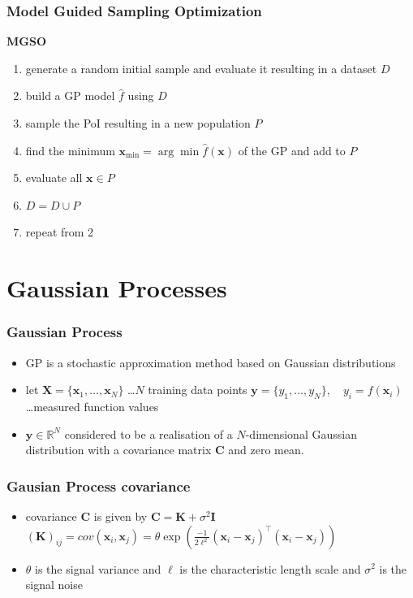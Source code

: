 \documentclass[sans,mathserif]{beamer}
\newcommand{\xx}{\mathrm{\mathbf{x}}}
\newcommand{\XX}{\mathrm{\mathbf{X}}}
\newcommand{\yy}{\mathrm{\mathbf{y}}}
\newcommand{\R}{\mathrm{\mathbb{R}}}
\newcommand{\CC}{\mathrm{\mathbf{C}}}
\newcommand{\KK}{\mathrm{\mathbf{K}}}
\newcommand{\II}{\mathrm{\mathbf{I}}}
\newcommand{\blue}[1]{{\color{blue} #1}}
\begin{document}
\begin{frame}
  \frametitle{Model Guided Sampling Optimization}

  \textbf{MGSO}
  \begin{enumerate}
    \item generate a random initial sample and evaluate it resulting in a dataset $D$
    \item build a GP model $\hat{f}$ using $D$
    \item sample the PoI resulting in a new population $P$
    \item find the minimum $\xx_{\min} = \arg\min \hat{f}(\xx)$ of the GP and add to $P$
    \item evaluate all $\xx \in P$
    \item $D = D \cup P$
    \item repeat from 2
  \end{enumerate}
\end{frame}

\section{Gaussian Processes}

\begin{frame}
  \frametitle{Gaussian Process}
  \begin{itemize}
    \item GP is a stochastic approximation method based on Gaussian distributions
    \item let \newline
        $\XX = \{\xx_1, \dots, \xx_N\}$ \dots $N$ training data points
        $\yy = \{y_1, \dots, y_N \}, \quad y_i = f(\xx_i)\ $ \dots measured function values
    \item $\yy \in \R^N$ considered to be a realisation of a \blue{$N$-dimensional} Gaussian distribution
        with a covariance matrix $\CC$ and zero mean.
  \end{itemize}
\end{frame}

\begin{frame}
  \frametitle{Gausian Process covariance}
  \begin{itemize}
    \item covariance $\CC$ is given by \newline
        $\CC = \KK + \sigma^2 \II$ \newline
        $(\KK)_{ij} = cov(\xx_i, \xx_j) = \theta \exp(\frac{-1}{2\ell^2} (\xx_i - \xx_j)^\top (\xx_i - \xx_j)) $
    \item $\theta$ is the \blue{signal variance} and $\ell$ is the \blue{characteristic length scale} and $\sigma^2$
        is the \blue{signal noise}
  \end{itemize}
\end{frame}
\end{document}
